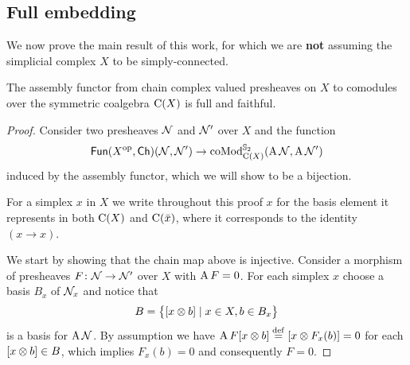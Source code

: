 
\subsection{Full embedding}\label{ss:full embedding}

We now prove the main result of this work, for which we are \textbf{not} assuming the simplicial complex $X$ to be simply-connected.

\begin{theorem*}
	The assembly functor from chain complex valued presheaves on $X$ to comodules over the symmetric coalgebra $\chains(X)$ is full and faithful.
\end{theorem*}

\begin{proof}
	Consider two presheaves $\cN$ and $\cN'$ over $X$ and the function
	\[
	\Fun(X^\op, \Ch)(\cN, \cN') \to \coMod^{\sym_2}_{\chains(X)}(\assembly \cN, \assembly \cN')
	\]
	induced by the assembly functor, which we will show to be a bijection.

	For a simplex $x$ in $X$ we write throughout this proof $x$ for the basis element it represents in both $\chains(X)$ and $\chains(\bar x)$, where it corresponds to the identity $(x \to x)$.

	We start by showing that the chain map above is injective.
	Consider a morphism of presheaves $F \colon \cN \to \cN'$ over $X$ with $\assembly F = 0$.
	For each simplex $x$ choose a basis $B_x$ of $\cN_x$ and notice that
	\[
	B = \set[\big]{[x \ot b] \mid x \in X, b \in B_x}
	\]
	is a basis for $\assembly \cN$.
	By assumption we have $\assembly F [x \ot b] \defeq [x \ot F_x(b)] = 0$ for each $[x \ot b] \in B$, which implies $F_x(b) = 0$ and consequently $F = 0$.


\end{proof}
